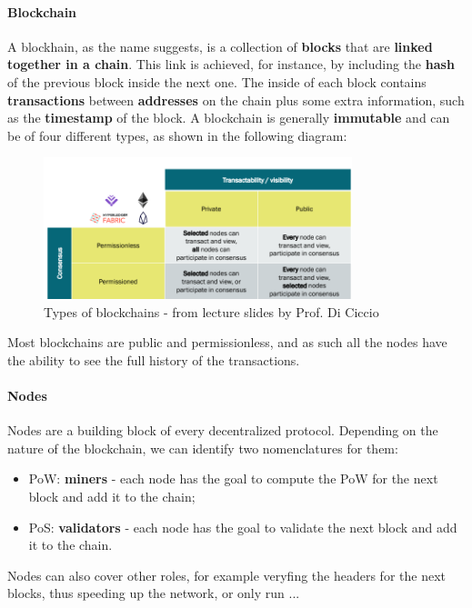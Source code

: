 \documentclass[12pt,a4paper,oneside]{article}
\theoremstyle{definition}
\begin{document}
\paragraph{Blockchain} A blockhain, as the name suggests, is a collection of \textbf{blocks} that are \textbf{linked together in a chain}. This link is achieved, for instance, by including the \textbf{hash} of the previous block inside the next one. The inside of each block contains \textbf{transactions} between \textbf{addresses} on the chain plus some extra information, such as the \textbf{timestamp} of the block. A blockchain is generally \textbf{immutable} and can be of four different types, as shown in the following diagram: 
\begin{figure}
  \centering
  \includegraphics[width=0.8\textwidth]{figures/bt_types.png}
  \caption{Types of blockchains - from lecture slides by Prof. Di Ciccio}
  \label{fig:blockchain_types}
\end{figure}
Most blockchains are public and permissionless, and as such all the nodes have the ability to see the full history of the transactions.


\paragraph{Nodes} Nodes are a building block of every decentralized protocol. Depending on the nature of the blockchain, we can identify two nomenclatures for them:
\begin{itemize}
  \item PoW: \textbf{miners} - each node has the goal to compute the PoW for the next block and add it to the chain;
  \item PoS: \textbf{validators} - each node has the goal to validate the next block and add it to the chain.
\end{itemize}
Nodes can also cover other roles, for example veryfing the headers for the next blocks, thus speeding up the network, or only run ... \\
\end{document}
